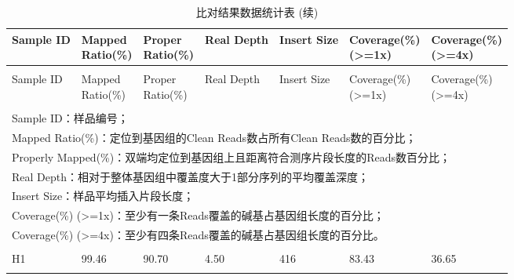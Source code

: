 \documentclass[
  a4paper,
  titlepage]{article}
\begin{document}
\begin{longtable}[t]{lllllll}
\caption{\label{tab:mapping-stat-table}比对结果数据统计表}\\
\toprule
Sample ID & \makecell[c]{Mapped\\Ratio(\%)} & \makecell[c]{Proper\\Ratio(\%)} & Real Depth & Insert Size & \makecell[c]{Coverage(\%)\\(>=1x)} & \makecell[c]{Coverage(\%)\\(>=4x)}\\
\midrule
\endfirsthead
\caption[]{\label{tab:mapping-stat-table}比对结果数据统计表 (续)}\\
\toprule
Sample ID & \makecell[c]{Mapped\\Ratio(\%)} & \makecell[c]{Proper\\Ratio(\%)} & Real Depth & Insert Size & \makecell[c]{Coverage(\%)\\(>=1x)} & \makecell[c]{Coverage(\%)\\(>=4x)}\\
\midrule
\endhead
\hline
\endfoot
\bottomrule
\multicolumn{7}{l}{\rule{0pt}{1em}\textit{注：}}\\
\multicolumn{7}{l}{\rule{0pt}{1em}Sample ID：样品编号；}\\
\multicolumn{7}{l}{\rule{0pt}{1em}Mapped Ratio(\%)：定位到基因组的Clean Reads数占所有Clean Reads数的百分比；}\\
\multicolumn{7}{l}{\rule{0pt}{1em}Properly Mapped(\%)：双端均定位到基因组上且距离符合测序片段长度的Reads数百分比；}\\
\multicolumn{7}{l}{\rule{0pt}{1em}Real Depth：相对于整体基因组中覆盖度大于1部分序列的平均覆盖深度；}\\
\multicolumn{7}{l}{\rule{0pt}{1em}Insert Size：样品平均插入片段长度；}\\
\multicolumn{7}{l}{\rule{0pt}{1em}Coverage(\%) (>=1x)：至少有一条Reads覆盖的碱基占基因组长度的百分比；}\\
\multicolumn{7}{l}{\rule{0pt}{1em}Coverage(\%) (>=4x)：至少有四条Reads覆盖的碱基占基因组长度的百分比。}\\
\endlastfoot
\cellcolor{gray!6}{FJMS} & \cellcolor{gray!6}{99.49} & \cellcolor{gray!6}{91.16} & \cellcolor{gray!6}{17.56} & \cellcolor{gray!6}{413} & \cellcolor{gray!6}{95.08} & \cellcolor{gray!6}{91.14}\\
 
H1 & 99.46 & 90.70 & 4.50 & 416 & 83.43 & 36.65\\
 
\cellcolor{gray!6}{H3} & \cellcolor{gray!6}{99.46} & \cellcolor{gray!6}{91.26} & \cellcolor{gray!6}{3.18} & \cellcolor{gray!6}{416} & \cellcolor{gray!6}{74.43} & \cellcolor{gray!6}{19.00}\\
 

\end{longtable}
\end{document}
